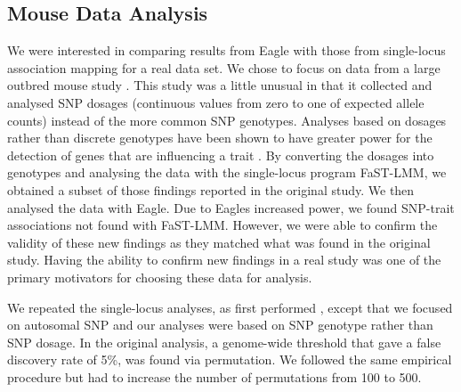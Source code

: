 \documentclass{article}
\begin{document}




\subsection{Mouse Data Analysis}


We were interested in comparing results from Eagle with those from single-locus association mapping for a real data set.
 We chose to focus on data from a large outbred mouse study \cite{nicod2016genome}. This study was a little unusual in that it collected and analysed SNP dosages (continuous values from zero to one of expected allele counts)  instead of the more common SNP genotypes. Analyses based on dosages rather than discrete genotypes have been shown to have greater power for the detection of genes that are influencing a trait  \cite{zheng2011comparison}. By converting the dosages into genotypes and analysing the data with the single-locus program FaST-LMM, we obtained a subset of those findings reported in the original study. We then analysed the data with Eagle. Due to Eagles increased power, we found SNP-trait associations not found with  FaST-LMM. However, we were 
 able to confirm the validity of these new findings as they matched what was found in the original study. Having the ability to confirm new findings  in a real study was 
 one of the primary motivators for choosing these data for analysis. 

We repeated the single-locus analyses, as first performed  \cite{nicod2016genome}, except 
that we focused on autosomal SNP and our analyses were based on SNP genotype  rather than SNP dosage. 
In the original analysis, a genome-wide threshold that gave a false discovery rate of 5\%, was found via permutation. We followed the 
same empirical procedure but had to increase the number of permutations from 100 to 500. 
\end{document}
